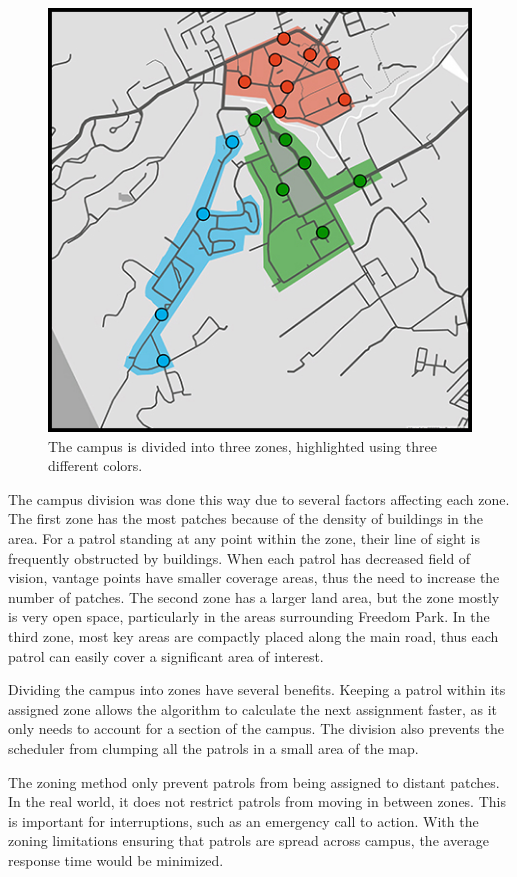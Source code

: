 \documentclass[journal]{./IEEE/IEEEtran}
\begin{document}
\begin{figure}[h]
\centering
\includegraphics[scale=0.40]{./Images/campuszones_uplb.jpg}
\caption{The campus is divided into three zones, highlighted using three different colors.}
\end{figure}

The campus division was done this way due to several factors affecting each zone. The first zone has the most patches because of the density of buildings in the area. For a patrol standing at any point within the zone, their line of sight is frequently obstructed by buildings. When each patrol has decreased field of vision, vantage points have smaller coverage areas, thus the need to increase the number of patches. The second zone has a larger land area, but the zone mostly is very open space, particularly in the areas surrounding Freedom Park. In the third zone, most key areas are compactly placed along the main road, thus each patrol can easily cover a significant area of interest.

Dividing the campus into zones have several benefits. Keeping a patrol within its assigned zone allows the algorithm to calculate the next assignment faster, as it only needs to account for a section of the campus. The division also prevents the scheduler from clumping all the patrols in a small area of the map.

The zoning method only prevent patrols from being assigned to distant patches. In the real world, it does not restrict patrols from moving in between zones. This is important for interruptions, such as an emergency call to action. With the zoning limitations ensuring that patrols are spread across campus, the average response time would be minimized.
\end{document}
